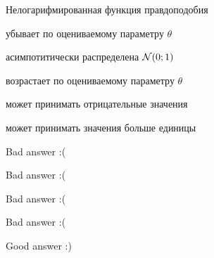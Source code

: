 
\begin{question}
Нелогарифмированная функция правдоподобия
\begin{answerlist}
  \item убывает по оцениваемому параметру \(\theta\)
  \item асимпотитически распределена \(\mathcal{N}(0;1)\)
  \item возрастает по оцениваемому параметру \(\theta\)
  \item может принимать отрицательные значения
  \item может принимать значения больше единицы
\end{answerlist}
\end{question}

\begin{solution}
\begin{answerlist}
  \item Bad answer :(
  \item Bad answer :(
  \item Bad answer :(
  \item Bad answer :(
  \item Good answer :)
\end{answerlist}
\end{solution}

